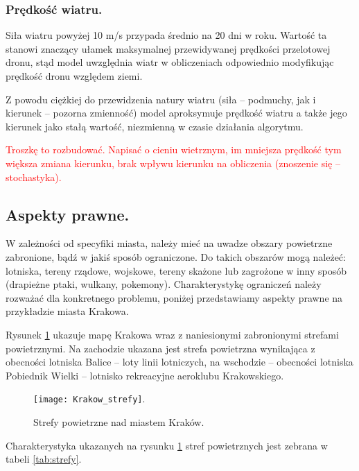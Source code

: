 \documentclass[twoside, 12pt]{article}
\begin{document}
\subsubsection{Prędkość wiatru.}
\par Siła wiatru powyżej 10 m/s przypada średnio na 20 dni w roku. Wartość ta stanowi znaczący ułamek maksymalnej przewidywanej prędkości przelotowej dronu, stąd model uwzględnia wiatr w obliczeniach odpowiednio modyfikując prędkość dronu względem ziemi. 
\par Z powodu ciężkiej do przewidzenia natury wiatru (siła – podmuchy, jak i kierunek – pozorna zmienność) model aproksymuje prędkość wiatru a także jego kierunek jako stałą wartość, niezmienną w czasie działania algorytmu.
\par \textcolor{red}{Troszkę to rozbudować. Napisać o cieniu wietrznym, im mniejsza prędkość tym większa zmiana kierunku, brak wpływu kierunku na obliczenia (znoszenie się – stochastyka).}



\subsection{Aspekty prawne.}
\par W zależności od specyfiki miasta, należy mieć na uwadze obszary powietrzne zabronione, bądź w jakiś sposób ograniczone. Do takich obszarów mogą należeć: lotniska, tereny rządowe, wojskowe, tereny skażone lub zagrożone w inny sposób (drapieżne ptaki, wulkany, pokemony). Charakterystykę ograniczeń należy rozważać dla konkretnego problemu, poniżej przedstawiamy aspekty prawne na przykładzie miasta Krakowa.
\par Rysunek \ref{fig:strefy} ukazuje mapę Krakowa wraz z naniesionymi zabronionymi strefami powietrznymi. Na zachodzie ukazana jest strefa powietrzna wynikająca z obecności lotniska Balice – loty linii lotniczych, na wschodzie – obecności lotniska Pobiednik Wielki – lotnisko rekreacyjne aeroklubu Krakowskiego.

\begin{figure}[h]
	\centering
	\texttt{[image: Krakow\_strefy]}.
	\caption{Strefy powietrzne nad miastem Kraków.\label{fig:strefy}}
\end{figure}

\par Charakterystyka ukazanych na rysunku \ref{fig:strefy} stref powietrznych jest zebrana w tabeli \ref{tab:strefy}.
\end{document}
